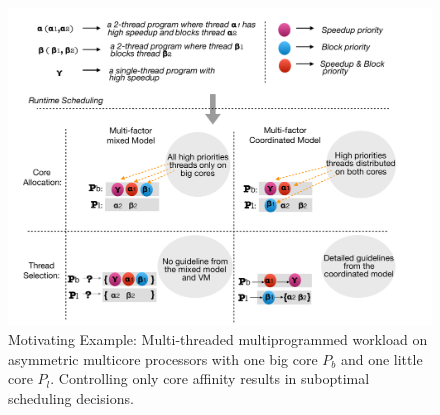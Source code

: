 \begin{figure}
\centering
\includegraphics[scale = 0.26]{figures/me.pdf}
\caption{Motivating Example: Multi-threaded multiprogrammed workload on asymmetric multicore processors with one big core $P_b$ and one little core $P_l$. Controlling only core affinity results in suboptimal scheduling decisions.}
\label{me}
\end{figure} 




